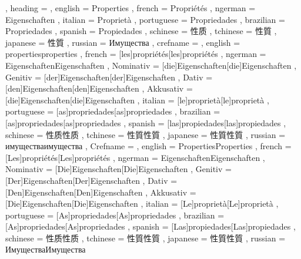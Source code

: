   {
    , heading =   {
                    , english     = Properties
                    , french      = Propriétés
                    , ngerman     = Eigenschaften
                    , italian     = Proprietà
                    , portuguese  = Propriedades
                    , brazilian   = Propriedades
                    , spanish     = Propiedades
                    , schinese    = 性质
                    , tchinese    = 性質
                    , japanese    = 性質
                    , russian     = Имущества
                  }
    , crefname =  {
                    , english     = {properties}{properties}
                    , french      = [les]{propriétés}[les]{propriétés}
                    , ngerman     = { {Eigenschaften}{Eigenschaften}
                                      , Nominativ = [die]{Eigenschaften}[die]{Eigenschaften}
                                      , Genitiv   = [der]{Eigenschaften}[der]{Eigenschaften}
                                      , Dativ     = [den]{Eigenschaften}[den]{Eigenschaften}
                                      , Akkusativ = [die]{Eigenschaften}[die]{Eigenschaften}
                                    }
                    , italian     = [le]{proprietà}[le]{proprietà}
                    , portuguese  = [as]{propriedades}[as]{propriedades}
                    , brazilian   = [as]{propriedades}[as]{propriedades}
                    , spanish     = [las]{propiedades}[las]{propiedades}
                    , schinese    = {性质}{性质}
                    , tchinese    = {性質}{性質}
                    , japanese    = {性質}{性質}
                    , russian     = {имущества}{имущества}
                  }
    , Crefname =  {
                    , english     = {Properties}{Properties}
                    , french      = [Les]{propriétés}[Les]{propriétés}
                    , ngerman     = { {Eigenschaften}{Eigenschaften}
                                      , Nominativ = [Die]{Eigenschaften}[Die]{Eigenschaften}
                                      , Genitiv   = [Der]{Eigenschaften}[Der]{Eigenschaften}
                                      , Dativ     = [Den]{Eigenschaften}[Den]{Eigenschaften}
                                      , Akkusativ = [Die]{Eigenschaften}[Die]{Eigenschaften}
                                    }
                    , italian     = [Le]{proprietà}[Le]{proprietà}
                    , portuguese  = [As]{propriedades}[As]{propriedades}
                    , brazilian   = [As]{propriedades}[As]{propriedades}
                    , spanish     = [Las]{propiedades}[Las]{propiedades}
                    , schinese    = {性质}{性质}
                    , tchinese    = {性質}{性質}
                    , japanese    = {性質}{性質}
                    , russian     = {Имущества}{Имущества}
                  }
  }

